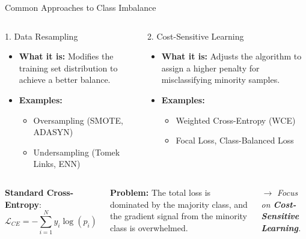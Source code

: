 \documentclass[aspectratio=169]{beamer}
\def \bblock{\begin{beamerboxesrounded}[upper=uppercolor,lower=lowercolor,shadow=true]}
\def \eblock{\end{beamerboxesrounded}}
\begin{document}
\begin{frame}{Common Approaches to Class Imbalance}

\vspace{0.03\textwidth} %

\begin{columns}[T] %

  \bblock{1. Data Resampling}
    \begin{itemize}
        \item \textbf{What it is:} Modifies the training set distribution to achieve a better balance.
        \item \textbf{Examples:}
        \begin{itemize}
            \item Oversampling (SMOTE, ADASYN)
            \item Undersampling (Tomek Links, ENN)
        \end{itemize}
    \end{itemize}
  \eblock

  \bblock{2. Cost-Sensitive Learning}
    \begin{itemize}
        \item \textbf{What it is:} Adjusts the algorithm to assign a higher penalty for misclassifying minority samples.
        \item \textbf{Examples:}
        \begin{itemize}
            \item Weighted Cross-Entropy (WCE)
            \item Focal Loss, Class-Balanced Loss
        \end{itemize}
    \end{itemize}
  \eblock

\end{columns}

\vspace{0.05\textwidth}

\begin{columns}[T]
  
    \textbf{Standard Cross-Entropy}:
    $$ \mathcal{L}_{CE} = - \sum_{i=1}^{N} y_i \log(p_i) $$

    \textbf{Problem:} The total loss is \alert{dominated} by the majority class, and the gradient signal from the minority class is overwhelmed.
    
    \vspace{0.3cm}
    $\to$ \textit{Focus on \textbf{Cost-Sensitive Learning}.}

\end{columns}

\end{frame}
\end{document}
